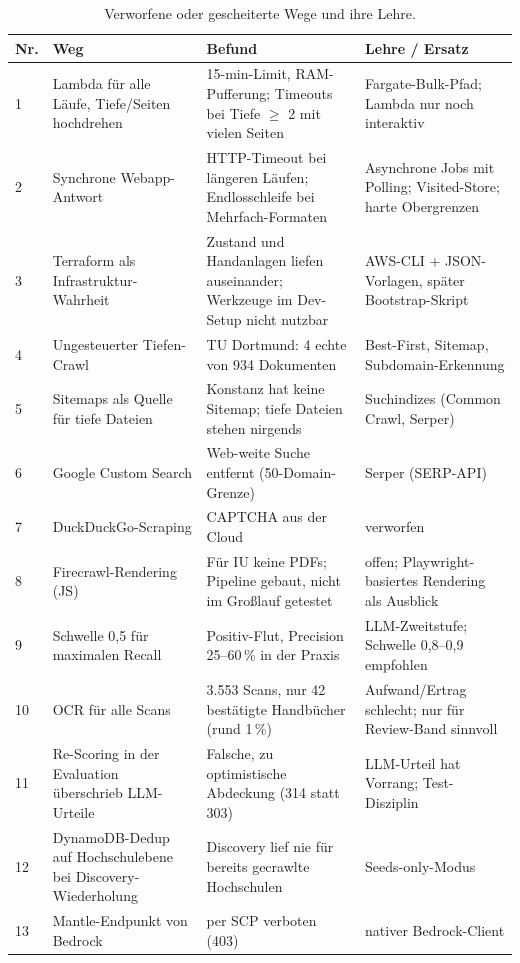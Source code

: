 \begin{table}[htbp]
\centering\small
\caption{Verworfene oder gescheiterte Wege und ihre Lehre.}\label{tab:sackgassen}
\begin{tabularx}{\linewidth}{@{}p{0.5cm} p{3.4cm} p{3.6cm} X@{}}
\toprule
\textbf{Nr.} & \textbf{Weg} & \textbf{Befund} & \textbf{Lehre / Ersatz} \\
\midrule
1 & Lambda für alle Läufe, Tiefe/Seiten hochdrehen & 15-min-Limit, RAM-Pufferung; Timeouts bei Tiefe $\ge$ 2 mit vielen Seiten & Fargate-Bulk-Pfad; Lambda nur noch interaktiv \\
2 & Synchrone Webapp-Antwort & HTTP-Timeout bei längeren Läufen; Endlosschleife bei Mehrfach-Formaten & Asynchrone Jobs mit Polling; Visited-Store; harte Obergrenzen \\
3 & Terraform als Infrastruktur-Wahrheit & Zustand und Handanlagen liefen auseinander; Werkzeuge im Dev-Setup nicht nutzbar & AWS-CLI + JSON-Vorlagen, später Bootstrap-Skript \\
4 & Ungesteuerter Tiefen-Crawl & TU Dortmund: 4 echte von 934 Dokumenten & Best-First, Sitemap, Subdomain-Erkennung \\
5 & Sitemaps als Quelle für tiefe Dateien & Konstanz hat keine Sitemap; tiefe Dateien stehen nirgends & Suchindizes (Common Crawl, Serper) \\
6 & Google Custom Search & Web-weite Suche entfernt (50-Domain-Grenze) & Serper (SERP-API) \\
7 & DuckDuckGo-Scraping & CAPTCHA aus der Cloud & verworfen \\
8 & Firecrawl-Rendering (JS) & Für IU keine PDFs; Pipeline gebaut, nicht im Großlauf getestet & offen; Playwright-basiertes Rendering als Ausblick \\
9 & Schwelle 0,5 für maximalen Recall & Positiv-Flut, Precision 25--60\,\% in der Praxis & LLM-Zweitstufe; Schwelle 0,8--0,9 empfohlen \\
10 & OCR für alle Scans & 3.553 Scans, nur 42 bestätigte Handbücher (rund 1\,\%) & Aufwand/Ertrag schlecht; nur für Review-Band sinnvoll \\
11 & Re-Scoring in der Evaluation überschrieb LLM-Urteile & Falsche, zu optimistische Abdeckung (314 statt 303) & LLM-Urteil hat Vorrang; Test-Disziplin \\
12 & DynamoDB-Dedup auf Hochschulebene bei Discovery-Wiederholung & Discovery lief nie für bereits gecrawlte Hochschulen & Seeds-only-Modus \\
13 & Mantle-Endpunkt von Bedrock & per SCP verboten (403) & nativer Bedrock-Client \\

\end{tabularx}
\end{table}
